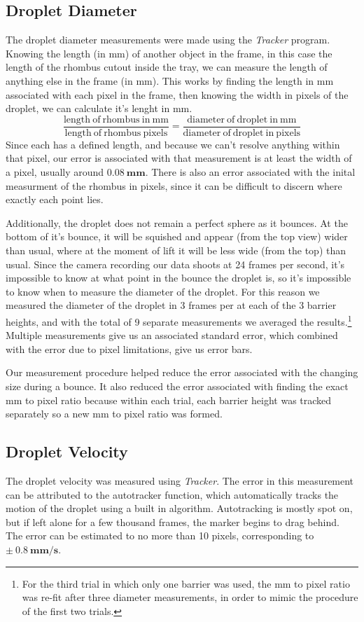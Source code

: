     \subsection{Droplet Diameter}
    The droplet diameter measurements were made using the \textit{Tracker} program. Knowing the length (in mm) of another object in the frame, in this case the length of the rhombus cutout inside the tray, we can measure the length of anything else in the frame (in mm). This works by finding the length in mm associated with each pixel in the frame, then knowing the width in pixels of the droplet, we can calculate it's lenght in mm.   
$$ 
\frac{\mathrm{length~of~rhombus~in~mm}}{\mathrm{length~of~rhombus~pixels}}= \frac{\mathrm{diameter~of~droplet~in~mm}}{\mathrm{diameter~of~droplet~in~pixels}} 
$$    
Since each has a defined length, and because we can't resolve anything within that pixel, our error is associated with that measurement is at least the width of a pixel, usually around $\mathbf{0.08~\mathrm{\textbf{mm}}}$. There is also an error associated with the inital measurment of the rhombus in pixels, since it can be difficult to discern where exactly each point lies.

Additionally, the droplet does not remain a perfect sphere as it bounces. At the bottom of it's bounce, it will be squished and appear (from the top view) wider than usual, where at the moment of lift it will be less wide (from the top) than usual. Since the camera recording our data shoots at 24 frames per second, it's impossible to know at what point in the bounce the droplet is, so it's impossible to know when to measure the diameter of the droplet. For this reason we measured the diameter of the droplet in 3 frames per at each of the 3 barrier heights, and with the total of 9 separate measurements we averaged the results.\footnote{For the third trial in which only one barrier was used, the mm to pixel ratio was re-fit after three diameter measurements, in order to mimic the procedure of the first two trials.} Multiple measurements give us an associated standard error, which combined with the error due to pixel limitations, give us error bars. 

Our measurement procedure helped reduce the error associated with the changing size during a bounce. It also reduced the error associated with finding the exact mm to pixel ratio because within each trial, each barrier height was tracked separately so a new mm to pixel ratio was formed.  

    \subsection{Droplet Velocity}
The droplet velocity was measured using \textit{Tracker}. The error in this measurement can be attributed to the autotracker function, which automatically tracks the motion of the droplet using a built in algorithm. Autotracking is mostly spot on, but if left alone for a few thousand frames, the marker begins to drag behind. The error can be estimated to no more than 10 pixels, corresponding to $\mathbf{\pm~0.8~\mathrm{\textbf{mm/s}}}$.

